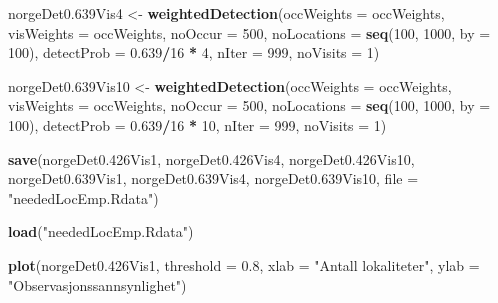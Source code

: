 \documentclass[]{article}
\newenvironment{Shaded}{\begin{snugshade}}{\end{snugshade}}
\newcommand{\KeywordTok}[1]{\textcolor[rgb]{0.13,0.29,0.53}{\textbf{#1}}}
\newcommand{\DataTypeTok}[1]{\textcolor[rgb]{0.13,0.29,0.53}{#1}}
\newcommand{\DecValTok}[1]{\textcolor[rgb]{0.00,0.00,0.81}{#1}}
\newcommand{\FloatTok}[1]{\textcolor[rgb]{0.00,0.00,0.81}{#1}}
\newcommand{\StringTok}[1]{\textcolor[rgb]{0.31,0.60,0.02}{#1}}
\newcommand{\OperatorTok}[1]{\textcolor[rgb]{0.81,0.36,0.00}{\textbf{#1}}}
\newcommand{\NormalTok}[1]{#1}
\begin{document}
\begin{Shaded}
\begin{Highlighting}[]
\NormalTok{norgeDet0.639Vis4 <-}\StringTok{ }\KeywordTok{weightedDetection}\NormalTok{(}\DataTypeTok{occWeights =}\NormalTok{ occWeights, }\DataTypeTok{visWeights =}\NormalTok{ occWeights, }
    \DataTypeTok{noOccur =} \DecValTok{500}\NormalTok{, }\DataTypeTok{noLocations =} \KeywordTok{seq}\NormalTok{(}\DecValTok{100}\NormalTok{, }\DecValTok{1000}\NormalTok{, }\DataTypeTok{by =} \DecValTok{100}\NormalTok{), }\DataTypeTok{detectProb =} \FloatTok{0.639}\OperatorTok{/}\DecValTok{16} \OperatorTok{*}\StringTok{ }
\StringTok{        }\DecValTok{4}\NormalTok{, }\DataTypeTok{nIter =} \DecValTok{999}\NormalTok{, }\DataTypeTok{noVisits =} \DecValTok{1}\NormalTok{)}

\NormalTok{norgeDet0.639Vis10 <-}\StringTok{ }\KeywordTok{weightedDetection}\NormalTok{(}\DataTypeTok{occWeights =}\NormalTok{ occWeights, }\DataTypeTok{visWeights =}\NormalTok{ occWeights, }
    \DataTypeTok{noOccur =} \DecValTok{500}\NormalTok{, }\DataTypeTok{noLocations =} \KeywordTok{seq}\NormalTok{(}\DecValTok{100}\NormalTok{, }\DecValTok{1000}\NormalTok{, }\DataTypeTok{by =} \DecValTok{100}\NormalTok{), }\DataTypeTok{detectProb =} \FloatTok{0.639}\OperatorTok{/}\DecValTok{16} \OperatorTok{*}\StringTok{ }
\StringTok{        }\DecValTok{10}\NormalTok{, }\DataTypeTok{nIter =} \DecValTok{999}\NormalTok{, }\DataTypeTok{noVisits =} \DecValTok{1}\NormalTok{)}


\KeywordTok{save}\NormalTok{(norgeDet0.426Vis1, norgeDet0.426Vis4, norgeDet0.426Vis10, norgeDet0.639Vis1, }
\NormalTok{    norgeDet0.639Vis4, norgeDet0.639Vis10, }\DataTypeTok{file =} \StringTok{"neededLocEmp.Rdata"}\NormalTok{)}
\end{Highlighting}
\end{Shaded}

\begin{Shaded}
\begin{Highlighting}[]
\KeywordTok{load}\NormalTok{(}\StringTok{"neededLocEmp.Rdata"}\NormalTok{)}
\end{Highlighting}
\end{Shaded}

\begin{Shaded}
\begin{Highlighting}[]
\KeywordTok{plot}\NormalTok{(norgeDet0.426Vis1, }\DataTypeTok{threshold =} \FloatTok{0.8}\NormalTok{, }\DataTypeTok{xlab =} \StringTok{"Antall lokaliteter"}\NormalTok{, }\DataTypeTok{ylab =} \StringTok{"Observasjonssannsynlighet"}\NormalTok{)}
\end{Highlighting}
\end{Shaded}
\end{document}
